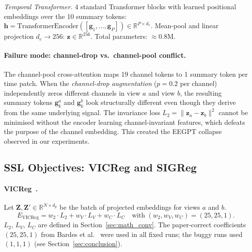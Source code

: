 \documentclass[11pt,a4paper]{article}
\begin{document}
\textit{Temporal Transformer.}
4 standard Transformer blocks with learned positional embeddings over the 10 summary
tokens: $\mathbf{h} = \mathrm{TransformerEncoder}([\mathbf{g}_1,\ldots,\mathbf{g}_P])
\in \mathbb{R}^{P \times d_e}$.
Mean-pool and linear projection $d_e \to 256$: $\mathbf{z} \in \mathbb{R}^{256}$.
Total parameters: $\approx 0.8$M.

\paragraph{Failure mode: channel-drop vs.\ channel-pool conflict.}
The channel-pool cross-attention maps 19 channel tokens to 1 summary token per
time patch.  When the \emph{channel-drop augmentation} ($p{=}0.2$ per channel)
independently zeros different channels in view $a$ and view $b$, the resulting
summary tokens $\mathbf{g}_k^a$ and $\mathbf{g}_k^b$ look structurally different
even though they derive from the same underlying signal.  The invariance loss
$L_2 = \|\mathbf{z}_a - \mathbf{z}_b\|^2$ cannot be minimised without the encoder
learning channel-invariant features, which defeats the purpose of the channel
embedding.  This created the EEGPT collapse observed in our experiments.

\subsection{SSL Objectives: VICReg and SIGReg}
\label{sec:math_ssl}

\paragraph{VICReg~\cite{vicreg}.}
Let $\mathbf{Z}, \mathbf{Z}' \in \mathbb{R}^{N \times d_p}$ be the batch of
projected embeddings for views $a$ and $b$.
\begin{equation}
  \boxed{E_{\mathrm{VICReg}} = w_2 \cdot L_2 + w_V \cdot L_V + w_C \cdot L_C}
  \quad\text{with}\; (w_2, w_V, w_C) = (25, 25, 1).
\end{equation}
$L_2$, $L_V$, $L_C$ are defined in Section~\ref{sec:math_conv}.
The paper-correct coefficients $(25, 25, 1)$ from Bardes et al.~\cite{vicreg}
were used in all fixed runs; the buggy runs used $(1, 1, 1)$ (see
Section~\ref{sec:conclusion}).
\end{document}

